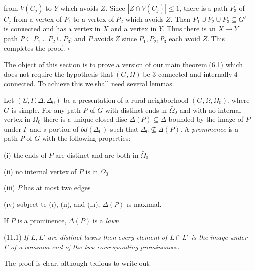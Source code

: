 \noindent from $V(C_j)$ to $Y$ which avoids $Z$. Since $|Z \cap V(C_j)| \le 1$, there is a path $P_3$ of $C_j$ from a vertex of $P_1$ to a vertex of $P_2$ which avoids $Z$. Then $P_1 \cup P_2 \cup P_3 \subseteq G'$ is connected and has a vertex in $X$ and a vertex in $Y$. Thus there is an $X \to Y$ path $P \subseteq P_1 \cup P_2 \cup P_3$; and $P$ avoids $Z$ since $P_1, P_2, P_3$ each avoid $Z$. This completes the proof. $\square$


The object of this section is to prove a version of our main theorem (6.1) which does not require the hypothesis that $(G, \Omega)$ be 3-connected and internally 4-connected. To achieve this we shall need several lemmas.

Let $(\Sigma, \Gamma, \Delta, \Delta_0)$ be a presentation of a rural neighborhood $(G, \Omega, \Omega_0)$, where $G$ is simple. For any path $P$ of $G$ with distinct ends in $\bar{\Omega}_0$ and with no internal vertex in $\bar{\Omega}_0$ there is a unique closed disc $\Delta(P) \subseteq \Delta$ bounded by the image of $P$ under $\Gamma$ and a portion of $bd(\Delta_0)$ such that $\Delta_0 \nsubseteq \Delta(P)$. A \textit{prominence} is a path $P$ of $G$ with the following properties:

\hspace*{12pt}(i) the ends of $P$ are distinct and are both in $\bar{\Omega}_0$

\hspace*{12pt}(ii) no internal vertex of $P$ is in $\bar{\Omega}_0$

\hspace*{12pt}(iii) $P$ has at most two edges

\hspace*{12pt}(iv) subject to (i), (ii), and (iii), $\Delta(P)$ is maximal.

If $P$ is a prominence, $\Delta(P)$ is a \textit{lawn}.

\stmt
(11.1) \textit{If $L, L'$ are distinct lawns then every element of $L \cap L'$ is the image under $\Gamma$ of a common end of the two corresponding prominences.}

The proof is clear, although tedious to write out.

